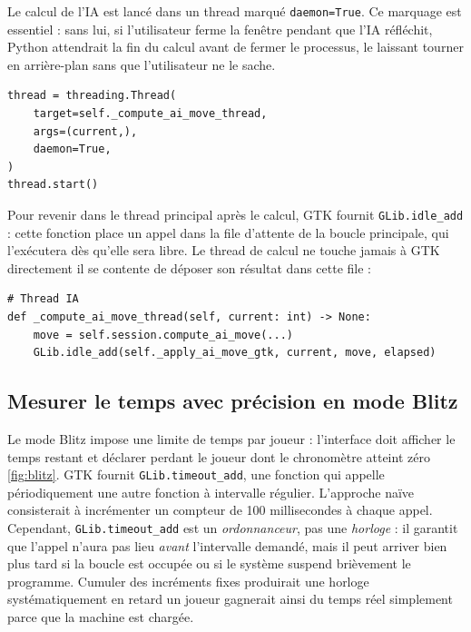 \documentclass[a4paper]{article}
\begin{document}
Le calcul de l'IA est lancé dans un thread marqué \texttt{daemon=True}.
Ce marquage est essentiel : sans lui, si l'utilisateur ferme la
fenêtre pendant que l'IA réfléchit, Python attendrait la fin du calcul
avant de fermer le processus, le laissant tourner en arrière-plan
sans que l'utilisateur ne le sache.

\begin{lstlisting}[caption={Lancement du calcul IA dans un thread séparé}]
thread = threading.Thread(
    target=self._compute_ai_move_thread,
    args=(current,),
    daemon=True,
)
thread.start()
\end{lstlisting}

Pour revenir dans le thread principal après le calcul, GTK fournit
\texttt{GLib.idle\_add} : cette fonction place un appel dans la file
d'attente de la boucle principale, qui l'exécutera dès qu'elle sera
libre. Le thread de calcul ne touche jamais à GTK directement il
se contente de déposer son résultat dans cette file :

\begin{lstlisting}[caption={Retour dans le thread principal via idle\_add}]
# Thread IA
def _compute_ai_move_thread(self, current: int) -> None:
    move = self.session.compute_ai_move(...)
    GLib.idle_add(self._apply_ai_move_gtk, current, move, elapsed)

\end{lstlisting}


\subsection{Mesurer le temps avec précision en mode Blitz}

Le mode Blitz impose une limite de temps par joueur : l'interface doit
afficher le temps restant et déclarer perdant le joueur dont le
chronomètre atteint zéro \ref{fig:blitz}. GTK fournit \texttt{GLib.timeout\_add},
une fonction qui appelle périodiquement une autre fonction à intervalle
régulier. L'approche naïve consisterait à incrémenter un compteur de
100 millisecondes à chaque appel. Cependant, \texttt{GLib.timeout\_add}
est un \emph{ordonnanceur}, pas une \emph{horloge} : il garantit que
l'appel n'aura pas lieu \emph{avant} l'intervalle demandé, mais il
peut arriver bien plus tard si la boucle est occupée ou si le système
suspend brièvement le programme. Cumuler des incréments fixes
produirait une horloge systématiquement en retard un joueur
gagnerait ainsi du temps réel simplement parce que la machine est
chargée.
\end{document}

